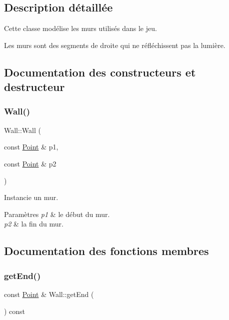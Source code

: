 \subsection{Description détaillée}
Cette classe modélise les murs utilisés dans le jeu. 

Les murs sont des segments de droite qui ne réfléchissent pas la lumière. 

\subsection{Documentation des constructeurs et destructeur}
\mbox{\label{class_wall_aba4c8b8e0290442241a406781940ad18}} 
\subsubsection{\texorpdfstring{Wall()}{Wall()}}
{\footnotesize\ttfamily Wall\+::\+Wall (\begin{DoxyParamCaption}\item[{const \mbox{\hyperlink{class_point}{Point}} \&}]{p1,  }\item[{const \mbox{\hyperlink{class_point}{Point}} \&}]{p2 }\end{DoxyParamCaption})}

Instancie un mur. 
\begin{DoxyParams}{Paramètres}
{\em p1} & le début du mur. \\
\hline
{\em p2} & la fin du mur. \\
\hline
\end{DoxyParams}


\subsection{Documentation des fonctions membres}
\mbox{\label{class_wall_ab710ef6a53f459ed7ce5667e55b0e9b9}} 
\subsubsection{\texorpdfstring{getEnd()}{getEnd()}}
{\footnotesize\ttfamily const \mbox{\hyperlink{class_point}{Point}} \& Wall\+::get\+End (\begin{DoxyParamCaption}{ }\end{DoxyParamCaption}) const}

